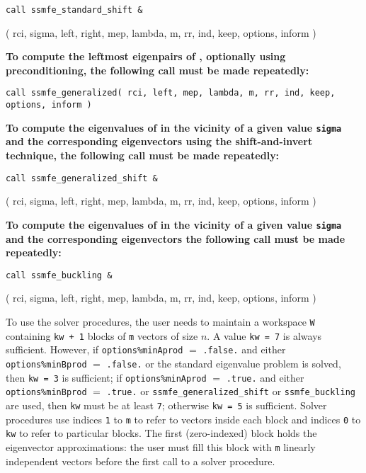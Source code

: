 \medskip
{\tt call
ssmfe\_standard\_shift \&

\hspace{8mm} 
( rci, sigma, left, right, mep, lambda, m, rr, ind, keep, options, inform )
}

\medskip
\noindent
{\bf
To compute the leftmost eigenpairs of ,
optionally using preconditioning,
the following call must be made repeatedly:
}

\medskip
{\tt call
ssmfe\_generalized( rci, left, mep, lambda, m, rr, ind, 
keep, options, inform )
}

\medskip
\noindent
{\bf
To compute the eigenvalues of  %
in the vicinity of 
a given value {\tt sigma}
and the corresponding eigenvectors using the shift-and-invert technique,
the following call must be made repeatedly:
}

\medskip
{\tt call
ssmfe\_generalized\_shift \&

\hspace{8mm} 
( rci, sigma, left, right, mep, lambda, m, rr, ind, keep, options, inform )
}

\medskip
\noindent
{\bf
To compute the eigenvalues of 
in the vicinity of a given value {\tt sigma}
and the corresponding eigenvectors 
the following call must be made repeatedly:
}

\medskip
{\tt call
ssmfe\_buckling \&

\hspace{8mm} 
( rci, sigma, left, right, mep, lambda, m, rr, ind, keep, options, inform )
}

\medskip
To use the solver procedures,
the user needs to maintain a workspace {\tt W} containing
{\tt kw + 1} blocks of {\tt m} vectors of size $n$.
A value {\tt kw = 7} is always sufficient. 
However, if {\tt options\%minAprod} $=$ {\tt .false.}
and either {\tt options\%minBprod} $=$ {\tt .false.} or 
the standard eigenvalue problem  is solved,
then {\tt kw = 3} is sufficient; 
if 
{\tt options\%minAprod} $=$ {\tt .true.} and
either {\tt options\%minBprod} $=$ {\tt .true.} or
{\tt ssmfe\_generalized\_shift} or {\tt ssmfe\_buckling} are used,
then {\tt kw} must be at least {\tt 7};
otherwise {\tt kw = 5} is sufficient.
Solver procedures
use indices {\tt 1} to {\tt m} 
to refer to vectors inside each block
and indices {\tt 0} to {\tt kw} 
to refer to particular blocks.
The first (zero-indexed) block holds the eigenvector approximations:
the user must fill this block with 
{\tt m} linearly independent vectors before the first call
to a solver procedure.


